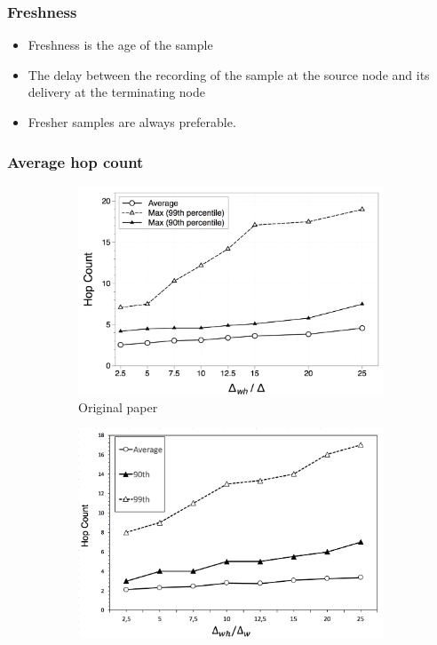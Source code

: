 \documentclass{beamer}
\begin{document}
\begin{frame}
\frametitle{Freshness}

\begin{itemize}
  \item Freshness is the age of the sample
  \item The delay between the recording of the sample at the source node and its delivery at the terminating node
  \item Fresher samples are always preferable.
\end{itemize}

\end{frame}

\begin{frame}
\frametitle{Average hop count}

\begin{figure}
\centering
\begin{subfigure}{.5\textwidth}
  \centering
  \includegraphics[keepaspectratio=true, width=1\linewidth]{images/paper_average_hop_count}
  \caption{Original paper}
  \label{fig:paper_average_hop_count}
\end{subfigure}%
\begin{subfigure}{.5\textwidth}
  \centering
  \includegraphics[keepaspectratio=true, width=1\linewidth]{images/average_hop_count}

\end{subfigure}
\end{figure}
\end{frame}
\end{document}
